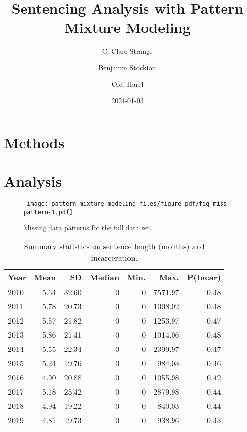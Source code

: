 \documentclass[
  letterpaper,
  DIV=11,
  numbers=noendperiod]{scrartcl}
\title{Sentencing Analysis with Pattern Mixture Modeling}
\author{C. Clare Strange \and Benjamin Stockton \and Ofer Harel}
\date{2024-01-03}
\begin{document}
\maketitle
\ifdefined\Shaded\renewenvironment{Shaded}{\begin{tcolorbox}[breakable, enhanced, interior hidden, sharp corners, frame hidden, boxrule=0pt, borderline west={3pt}{0pt}{shadecolor}]}{\end{tcolorbox}}\fi

\hypertarget{methods}{%
\section{Methods}\label{methods}}

\hypertarget{analysis}{%
\section{Analysis}\label{analysis}}

\begin{figure}

{\centering \texttt{[image: pattern-mixture-modeling\_files/figure-pdf/fig-miss-pattern-1.pdf]}

}

\caption{\label{fig-miss-pattern}Missing data patterns for the full data
set.}

\end{figure}

\hypertarget{tbl-yearly-summary}{}
\begin{table}
\caption{\label{tbl-yearly-summary}Summary statistics on sentence length (months) and incarceration. }\tabularnewline

\centering
\begin{tabular}{l|r|r|r|r|r|r}
\hline
Year & Mean & SD & Median & Min. & Max. & P(Incar)\\
\hline
2010 & 5.64 & 32.60 & 0 & 0 & 7571.97 & 0.48\\
\hline
2011 & 5.78 & 20.73 & 0 & 0 & 1008.02 & 0.48\\
\hline
2012 & 5.57 & 21.82 & 0 & 0 & 1253.97 & 0.47\\
\hline
2013 & 5.86 & 21.41 & 0 & 0 & 1014.06 & 0.48\\
\hline
2014 & 5.55 & 22.34 & 0 & 0 & 2399.97 & 0.47\\
\hline
2015 & 5.24 & 19.76 & 0 & 0 & 984.03 & 0.46\\
\hline
2016 & 4.90 & 20.88 & 0 & 0 & 1055.98 & 0.42\\
\hline
2017 & 5.18 & 25.42 & 0 & 0 & 2879.98 & 0.44\\
\hline
2018 & 4.94 & 19.22 & 0 & 0 & 840.03 & 0.44\\
\hline
2019 & 4.81 & 19.73 & 0 & 0 & 938.96 & 0.43\\
\hline
\end{tabular}
\end{table}
\end{document}
